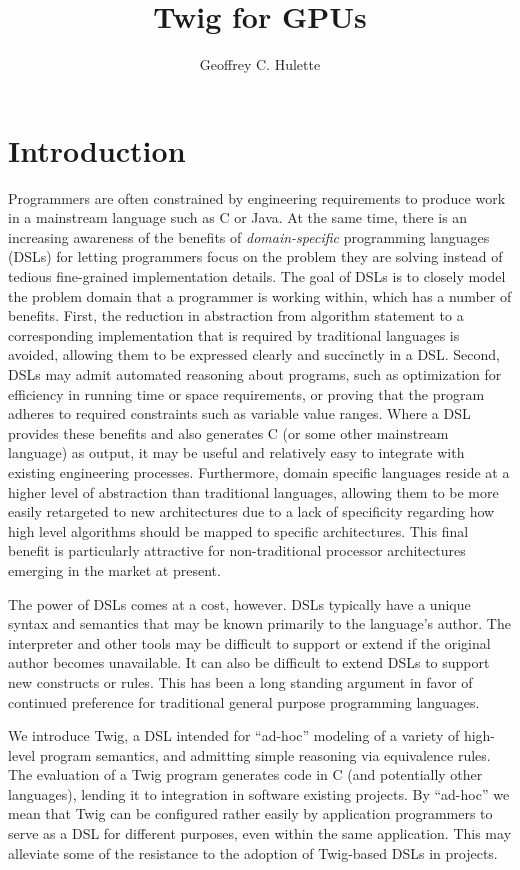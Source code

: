 \documentclass[11pt]{article}
\title{Twig for GPUs}
\author{Geoffrey C. Hulette}  %
\begin{document}
\maketitle
\thispagestyle{empty}

\section{Introduction}

Programmers are often constrained by engineering requirements to
produce work in a mainstream language such as C or Java.  At the same
time, there is an increasing awareness of the benefits of
\emph{domain-specific} programming languages (DSLs) for letting
programmers focus on the problem they are solving instead of tedious
fine-grained implementation details. The goal of DSLs is to closely
model the problem domain that a programmer is working within, which
has a number of benefits. First, the reduction in abstraction from
algorithm statement to a corresponding implementation that is required
by traditional languages is avoided, allowing them to be expressed
clearly and succinctly in a DSL. Second, DSLs may admit automated
reasoning about programs, such as optimization for efficiency in
running time or space requirements, or proving that the program
adheres to required constraints such as variable value ranges. Where a
DSL provides these benefits and also generates C (or some other
mainstream language) as output, it may be useful and relatively easy
to integrate with existing engineering processes.  Furthermore, domain
specific languages reside at a higher level of abstraction than
traditional languages, allowing them to be more easily retargeted to
new architectures due to a lack of specificity regarding how high
level algorithms should be mapped to specific architectures.  This
final benefit is particularly attractive for non-traditional processor
architectures emerging in the market at present.

The power of DSLs comes at a cost, however. DSLs typically have a unique
syntax and semantics that may be known primarily to the language's author. The
interpreter and other tools may be difficult to support or extend if the
original author becomes unavailable. It can also be difficult to extend DSLs
to support new constructs or rules. This has been a long standing argument
in favor of continued preference for traditional general purpose programming
languages.

We introduce Twig, a DSL intended for ``ad-hoc'' modeling of a variety of
high-level program semantics, and admitting simple reasoning via equivalence
rules. The evaluation of a Twig program generates code in C (and potentially
other languages), lending it to integration in software existing projects. By
``ad-hoc'' we mean that Twig can be configured rather easily by application
programmers to serve as a DSL for different purposes, even within the same
application. This may alleviate some of the resistance to the adoption of
Twig-based DSLs in projects. %
\end{document}
